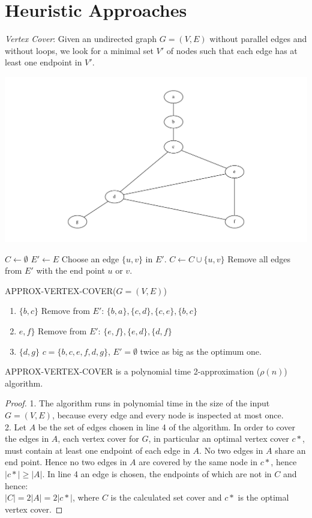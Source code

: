 \section{Heuristic Approaches}
\emph{Vertex Cover}: Given an undirected graph $G=(V,E)$ without parallel edges and without loops,
we look for a minimal set $V'$ of nodes such that each edge has at least one endpoint in $V'$.
\begin{example*}
\includegraphics[width=\textwidth]{diagrams/Chapter7_Example1.pdf}
\end{example*}
\begin{algorithm}
\begin{algorithmic}[1]
\State $C \gets \emptyset$
\State $E' \gets E$
	\State Choose an edge $\{u,v\}$ in $E'$.
	\State $C \gets C \cup \{u,v\}$
	\State Remove all edges from $E'$ with the end point $u$ or $v$.
\EndWhile
\end{algorithmic}
\caption{APPROX-VERTEX-COVER($G=(V,E)$)}
\end{algorithm}

\begin{enumerate}
  \item $\{b,c\}$ Remove from $E'$: $\{b,a\}, \{c,d\}, \{c,e\}, \{b,c\}$
  \item $e,f\}$ Remove from $E'$: $\{e,f\}, \{e,d\}, \{d,f\}$
  \item $\{d,g\}$ $c=\{b,c,e,f,d,g\}$, $E'=\emptyset$ twice as big as the optimum one.
\end{enumerate}

\begin{theorem}
APPROX-VERTEX-COVER is a polynomial time 2-approximation ($\rho(n)$) algorithm. 
\end{theorem}
\begin{proof}
1. The algorithm runs in polynomial time in the size of the input $G=(V,E)$, because every edge and every node is inspected at 
most once.\\
2. Let $A$ be the set of edges chosen in line 4 of the algorithm. In order to cover the edges in $A$, each vertex cover for $G$, in particular
an optimal vertex cover $c*$, must contain at least one endpoint of each edge in $A$. No two edges in $A$ share an end point. Hence no
two edges in $A$ are covered by the same node in $c*$, hence $|c*|\ge |A|$. In line 4 an edge is chosen, the endpoints of which are not in $C$ and
hence:\\$|C| = 2|A| = 2|c*|$, where $C$ is the calculated set cover and $c*$ is the optimal vertex cover.
\end{proof}
